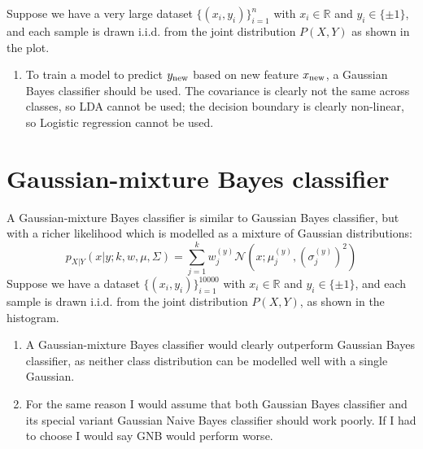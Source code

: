 \documentclass[a4paper, 10pt]{article}
\begin{document}
Suppose we have a very large dataset $\{(x_i, y_i)\}_{i=1}^n$ with $x_i \in \mathbb{R}$ and $y_i \in \{\pm 1\}$, and each sample is drawn i.i.d. from the joint distribution $P(X, Y)$ as shown in the plot.
\begin{enumerate}[label=(\alph*), resume]
    \item To train a model to predict $y_{\rm new}$ based on new feature $x_{\rm new}$, a Gaussian Bayes classifier should be used. The covariance is clearly not the same across classes, so LDA cannot be used; the decision boundary is clearly non-linear, so Logistic regression cannot be used.
\end{enumerate}


\section{Gaussian-mixture Bayes classifier}

A Gaussian-mixture Bayes classifier is similar to Gaussian Bayes classifier, but with a richer likelihood which is modelled as a mixture of Gaussian distributions:
\begin{equation}
    p_{X|Y}(x|y; k, w, \mu, \Sigma) = \sum_{j=1}^k w_j^{(y)} \mathcal{N}\left(x; \mu_j^{(y)}, (\sigma^{(y)}_j)^2\right)
\end{equation}
Suppose we have a dataset $\{(x_i, y_i)\}_{i=1}^{10000}$ with $x_i \in \mathbb{R}$ and $y_i \in \{\pm 1\}$, and each sample is drawn i.i.d. from the joint distribution $P(X, Y)$, as shown in the histogram.
\begin{enumerate}[label=(\alph*)]
    \item A Gaussian-mixture Bayes classifier would clearly outperform Gaussian Bayes classifier, as neither class distribution can be modelled well with a single Gaussian.
    \item For the same reason I would assume that both Gaussian Bayes classifier and its special variant Gaussian Naive Bayes classifier should work poorly. If I had to choose I would say GNB would perform worse.
\end{enumerate}
\end{document}
